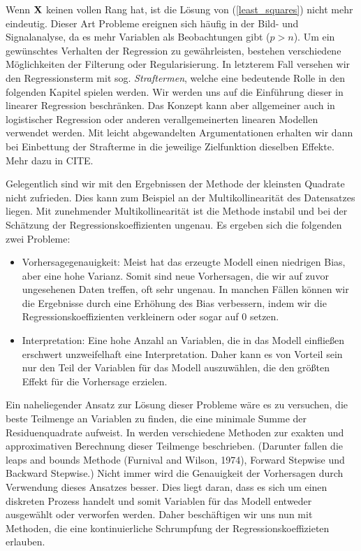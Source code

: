 Wenn $\mathbf{X}$ keinen vollen Rang hat, ist die Lösung von (\ref{least_squares}) nicht mehr eindeutig. Dieser Art Probleme ereignen sich häufig in der Bild- und Signalanalyse, da es mehr Variablen als Beobachtungen gibt ($p > n$). Um ein gewünschtes Verhalten der Regression zu gewährleisten, bestehen verschiedene Möglichkeiten der Filterung oder Regularisierung. In letzterem Fall versehen wir den Regressionsterm mit sog. \textit{Straftermen}, welche eine bedeutende Rolle in den folgenden Kapitel spielen werden. Wir werden uns auf die Einführung dieser in linearer Regression beschränken. Das Konzept kann aber allgemeiner auch in logistischer Regression oder anderen verallgemeinerten linearen Modellen verwendet werden. Mit leicht abgewandelten Argumentationen erhalten wir dann bei Einbettung der Strafterme in die jeweilige Zielfunktion dieselben Effekte. Mehr dazu in CITE.

Gelegentlich sind wir mit den Ergebnissen der Methode der kleinsten Quadrate nicht zufrieden. Dies kann zum Beispiel an der Multikollinearität des Datensatzes liegen. Mit zunehmender Multikollinearität ist die Methode instabil und bei der Schätzung der Regressionskoeffizienten ungenau. Es ergeben sich die folgenden zwei Probleme:
\begin{itemize}
\item Vorhersagegenauigkeit: Meist hat das erzeugte Modell einen niedrigen Bias, aber eine hohe Varianz. Somit sind neue Vorhersagen, die wir auf zuvor ungesehenen Daten treffen, oft sehr ungenau. In manchen Fällen können wir die Ergebnisse durch eine Erhöhung des Bias verbessern, indem wir die Regressionskoeffizienten verkleinern oder sogar auf 0 setzen.
\item Interpretation: Eine hohe Anzahl an Variablen, die in das Modell einfließen erschwert unzweifelhaft eine Interpretation. Daher kann es von Vorteil sein nur den Teil der Variablen für das Modell auszuwählen, die den größten Effekt für die Vorhersage erzielen.
\end{itemize}

Ein naheliegender Ansatz zur Lösung dieser Probleme wäre es zu versuchen, die beste Teilmenge an Variablen zu finden, die eine minimale Summe der Residuenquadrate aufweist. In \cite{hastie_elements} werden verschiedene Methoden zur exakten und approximativen Berechnung dieser Teilmenge beschrieben. (Darunter fallen die leaps and bounds Methode (Furnival and Wilson, 1974), Forward Stepwise und Backward Stepwise.) Nicht immer wird die Genauigkeit der Vorhersagen durch Verwendung dieses Ansatzes besser. Dies liegt daran, dass es sich um einen diskreten Prozess handelt und somit Variablen für das Modell entweder ausgewählt oder verworfen werden. Daher beschäftigen wir uns nun mit Methoden, die eine kontinuierliche Schrumpfung der Regressionskoeffizieten erlauben.\\

